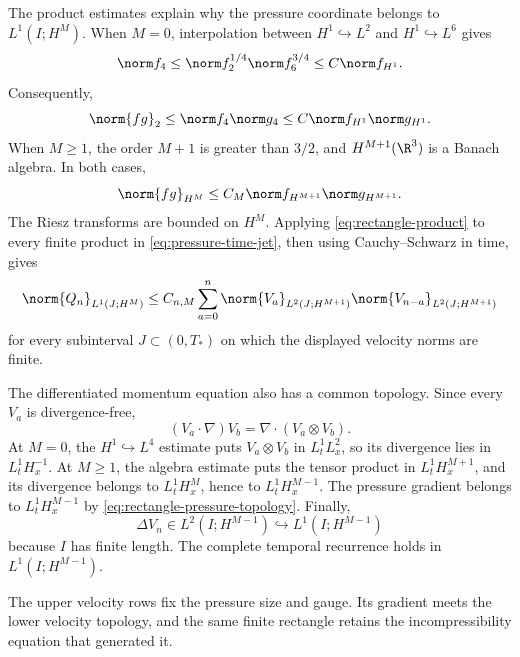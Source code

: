 The product estimates explain why the pressure coordinate belongs to
\(L^1(I;H^M)\).  When \(M=0\), interpolation between
\(H^1\hookrightarrow L^2\) and \(H^1\hookrightarrow L^6\) gives
\begin{equation*}
 \norm f_4
 \le\norm f_2^{1/4}\norm f_6^{3/4}
 \le C\norm f_{H^1}.
\end{equation*}
Consequently,
\begin{equation*}
 \norm{fg}_2
 \le\norm f_4\norm g_4
 \le C\norm f_{H^1}\norm g_{H^1}.
\end{equation*}
When \(M\ge1\), the order \(M+1\) is greater than \(3/2\), and
\(H^{M+1}(\R^3)\) is a Banach algebra.  In both cases,
\begin{equation}
 \norm{fg}_{H^M}
 \le C_M
 \norm f_{H^{M+1}}\norm g_{H^{M+1}}.
 \label{eq:rectangle-product}
\end{equation}
The Riesz transforms are bounded on \(H^M\).  Applying
\eqref{eq:rectangle-product} to every finite product in
\eqref{eq:pressure-time-jet}, then using Cauchy--Schwarz in time, gives
\begin{equation}
 \norm{Q_n}_{L^1(J;H^M)}
 \le C_{n,M}\sum_{a=0}^n
 \norm{V_a}_{L^2(J;H^{M+1})}
 \norm{V_{n-a}}_{L^2(J;H^{M+1})}
 \label{eq:rectangle-pressure-topology}
\end{equation}
for every subinterval \(J\subset(0,T_*)\) on which the displayed velocity
norms are finite.

The differentiated momentum equation also has a common topology.  Since every
\(V_a\) is divergence-free,
\begin{equation*}
 (V_a\cdot\nabla)V_b
 =\nabla\cdot(V_a\otimes V_b).
\end{equation*}
At \(M=0\), the \(H^1\hookrightarrow L^4\) estimate puts
\(V_a\otimes V_b\) in \(L^1_tL^2_x\), so its divergence lies in
\(L^1_tH^{-1}_x\).  At \(M\ge1\), the algebra estimate puts the tensor
product in \(L^1_tH^{M+1}_x\), and its divergence belongs to
\(L^1_tH^M_x\), hence to \(L^1_tH^{M-1}_x\).  The pressure gradient belongs
to \(L^1_tH^{M-1}_x\) by
\eqref{eq:rectangle-pressure-topology}.  Finally,
\begin{equation*}
 \Delta V_n\in L^2(I;H^{M-1})
 \hookrightarrow L^1(I;H^{M-1})
\end{equation*}
because \(I\) has finite length.  The complete temporal recurrence
holds in \(L^1(I;H^{M-1})\).

The upper velocity rows fix the pressure size and gauge.  Its gradient meets
the lower velocity topology, and the same finite rectangle retains the
incompressibility equation that generated it.

